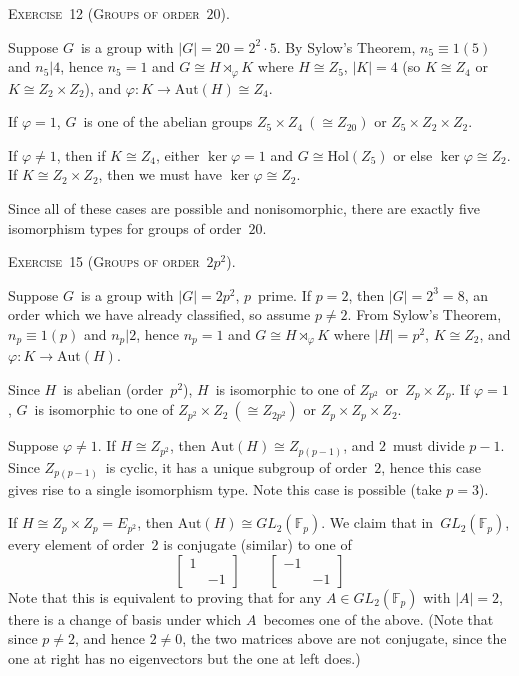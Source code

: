 \documentclass[letterpaper]{article}
\newcommand{\exercise}[1]{\goodbreak\noindent\textsc{Exercise~{#1}.}}
\newcommand{\F}{\mathbb{F}}
\newcommand{\iso}{\cong}
\newcommand{\aut}{\mathrm{Aut}}
\newcommand{\hol}{\mathrm{Hol}}
\newcommand{\ord}[1]{|{#1}|}
\begin{document}
\bigskip
\exercise{12 (Groups of order~$20$)}

Suppose $G$~is a group with $\ord{G}=20=2^2\cdot 5$. By Sylow's Theorem, $n_5\equiv1(5)$ and $n_5|4$, hence $n_5=1$ and $G\iso H\rtimes_{\varphi}K$ where $H\iso Z_5$, $\ord{K}=4$ (so $K\iso Z_4$ or $K\iso Z_2\times Z_2$), and $\varphi:K\to\aut(H)\iso Z_4$.

If $\varphi=1$, $G$~is one of the abelian groups $Z_5\times Z_4\ (\iso Z_{20})$ or $Z_5\times Z_2\times Z_2$.

If $\varphi\ne1$, then if $K\iso Z_4$, either $\ker\varphi=1$ and $G\iso\hol(Z_5)$ or else $\ker\varphi\iso Z_2$. If $K\iso Z_2\times Z_2$, then we must have $\ker\varphi\iso Z_2$.

Since all of these cases are possible and nonisomorphic, there are exactly five isomorphism types for groups of order~$20$.

\bigskip
\exercise{15 (Groups of order~$2p^2$)}

Suppose $G$~is a group with $\ord{G}=2p^2$, $p$~prime. If $p=2$, then $\ord{G}=2^3=8$, an order which we have already classified, so assume $p\ne2$. From Sylow's Theorem, $n_p\equiv 1(p)$ and $n_p|2$, hence $n_p=1$ and $G\iso H\rtimes_{\varphi}K$ where $\ord{H}=p^2$, $K\iso Z_2$, and $\varphi:K\to\aut(H)$.

Since $H$~is abelian (order~$p^2$), $H$~is isomorphic to one of $Z_{p^2}$~or~$Z_p\times Z_p$. If $\varphi=1$, $G$~is isomorphic to one of $Z_{p^2}\times Z_2\ (\iso Z_{2p^2})$ or $Z_p\times Z_p\times Z_2$.

Suppose $\varphi\ne1$. If $H\iso Z_{p^2}$, then $\aut(H)\iso Z_{p(p-1)}$, and $2$~must divide $p-1$. Since $Z_{p(p-1)}$~is cyclic, it has a unique subgroup of order~$2$, hence this case gives rise to a single isomorphism type. Note this case is possible (take $p=3$).

If $H\iso Z_p\times Z_p=E_{p^2}$, then $\aut(H)\iso GL_2(\F_p)$. We claim that in~$GL_2(\F_p)$, every element of order~$2$ is conjugate (similar) to one of
$$\left[\begin{matrix}1&\\&-1\end{matrix}\right]\qquad\left[\begin{matrix}-1&\\&-1\end{matrix}\right]$$
Note that this is equivalent to proving that for any $A\in GL_2(\F_p)$ with $\ord{A}=2$, there is a change of basis under which $A$~becomes one of the above. (Note that since $p\ne2$, and hence $2\ne0$, the two matrices above are not conjugate, since the one at right has no eigenvectors but the one at left does.)
\end{document}
